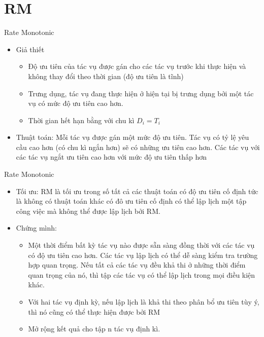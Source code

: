\documentclass{beamer}
\newcommand{\bi}{\begin{itemize}}
\newcommand{\ei}{\end{itemize}}
\begin{document}
\section{RM}
\begin{frame}{Rate Monotonic}
\begin{itemize}
\item Giả thiết
\bi
\item Độ ưu tiên của tác vụ được gán cho các tác vụ trước khi thực hiện và không thay đổi theo thời gian (độ ưu tiên là tĩnh)
\item Trưng dụng, tác vụ đang thực hiện ở hiện tại bị trưng dụng bởi một tác vụ có mức độ ưu tiên cao hơn.
\item Thời gian hết hạn bằng với chu kì $D_i = T_i$
\ei
\item Thuật toán: Mỗi tác vụ được gán một mức độ ưu tiên. Tác vụ có tỷ lệ yêu cầu cao hơn (có chu kì ngắn hơn) sẽ có những ưu tiên cao hơn. Các tác vụ với các tác vụ ngắt ưu tiên cao hơn với mức độ ưu tiên thấp hơn
\end{itemize}
\end{frame}
\begin{frame}{Rate Monotonic}
\begin{itemize}
\item Tối ưu: RM là tối ưu trong số tất cả các thuật toán có độ ưu tiên cố định tức là không có thuật toán khác có đô ưu tiên cố định có thể lập lịch một tập công việc mà không thể được lập lịch bởi RM.
\item Chứng mình:
\begin{itemize}
\item Một thời điểm bất kỳ tác vụ nào được sẵn sàng đồng thời với các tác vụ có độ ưu tiên cao hơn. Các tác vụ lập lịch có thể dễ sàng kiểm tra trường hợp quan trọng. Nếu tất cả các tác vụ đều khả thi ở những thời điểm quan trọng của nó, thì tập các tác vụ có thể lập lịch trong mọi điều kiện khác.
\item Với hai tác vụ định kỳ, nếu lập lịch là khả thi theo phân bổ ưu tiên tùy ý, thì nó cũng có thể thực hiện được bởi RM
\item Mở rộng kết quả cho tập n tác vụ định kì.
\end{itemize}
\end{itemize}
\end{frame}
\end{document}
